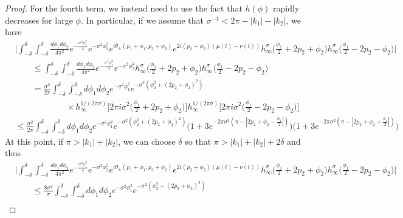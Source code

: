 \documentclass[../thesis-main/thesis-main]{subfiles}
\begin{document}
\begin{proof}
For the fourth term, we instead need to use the fact that $h(\phi)$ rapidly decreases for large $\phi$.  In particular, if we assume that $\sigma^{-1} < 2\pi - |k_1| - |k_2|$, we have
\begin{align}
    &\Bigg | \int_{-\delta}^\delta \int_{-\delta}^\delta \frac{d\phi_1 d\phi_2}{4\pi^2} e^{- \frac{\sigma^2 \phi_1^2}{4}}e^{-\sigma^2 \phi_2^2} e^{ i \theta_{\pm}(p_1+\phi_1, p_2+\phi_2)} e^{ 2 i( p_2 + \phi_2)(\mu(t) - \nu(t))}   h_\infty^{\sigma} \Big(\frac{\phi_1}{2} + 2p_2 +\phi_2 \Big) h_\infty^{\sigma} \Big(\frac{\phi_1}{2} - 2p_2 -\phi_2 \Big) \Bigg| \nonumber\\
    &  \qquad \leq  \int_{-\delta}^\delta \int_{-\delta}^\delta \frac{d\phi_1 d\phi_2}{4\pi^2} e^{- \frac{\sigma^2 \phi_1^2}{4}}e^{-\sigma^2 \phi_2^2} h_\infty^{\sigma} \Big(\frac{\phi_1}{2} + 2p_2 +\phi_2 \Big) h_\infty^{\sigma} \Big(\frac{\phi_1}{2} - 2p_2 -\phi_2 \Big)\\
    &\qquad = \frac{\sigma^2}{2\pi}\int_{-\delta}^\delta \int_{-\delta}^\delta {d\phi_1 d\phi_2}  e^{- \sigma^2 \phi_1^2}e^{-\sigma^2 (\phi_2^2 + (2p_2 + \phi_2)^2)} \nonumber\\
    &\qquad \qquad \qquad \times h_{\infty}^{1/(2\pi\sigma)} \Big[2\pi i \sigma^2 \Big(\frac{\phi_1}{2} + 2p_2 +\phi_2 \Big)\Big] h_\infty^{1/(2\pi\sigma)}\Big[ 2\pi i \sigma^2  \Big(\frac{\phi_1}{2} - 2p_2 -\phi_2 \Big) \Big]\\
    & \leq  \frac{\sigma^2}{2\pi}\int_{-\delta}^\delta \int_{-\delta}^\delta {d\phi_1 d\phi_2}  e^{- \sigma^2 \phi_1^2}e^{-\sigma^2 (\phi_2^2 + (2p_2 + \phi_2)^2)}\big( 1 + 3 e^{ - 2 \pi \sigma^2 ( \pi - | 2 p_2 + \phi_2 - \frac{\phi_1}{2} | )}\big) \big( 1 + 3 e^{ - 2 \pi \sigma^2 ( \pi - | 2 p_2 + \phi_2 + \frac{\phi_1}{2} | )}\big) 
\end{align}
At this point, if $\pi > |k_1| + |k_2|$, we can choose $\delta$ so that $\pi > |k_1| + |k_2| + 2\delta$ and thus 
\begin{align}
    &\Bigg | \int_{-\delta}^\delta \int_{-\delta}^\delta \frac{d\phi_1 d\phi_2}{4\pi^2} e^{- \frac{\sigma^2 \phi_1^2}{4}}e^{-\sigma^2 \phi_2^2} e^{ i \theta_{\pm}(p_1+\phi_1, p_2+\phi_2)} e^{ 2 i( p_2 + \phi_2)(\mu(t) - \nu(t))}   h_\infty^{\sigma} \Big(\frac{\phi_1}{2} + 2p_2 +\phi_2 \Big) h_\infty^{\sigma} \Big(\frac{\phi_1}{2} - 2p_2 -\phi_2 \Big) \Bigg| \nonumber\\
    &  \qquad \leq \frac{8\sigma^2}{\pi}\int_{-\delta}^\delta \int_{-\delta}^\delta {d\phi_1 d\phi_2}  e^{- \sigma^2 \phi_1^2}e^{-\sigma^2 (\phi_2^2 + (2p_2 + \phi_2)^2)}\\

\end{align}
\end{proof}
\end{document}
